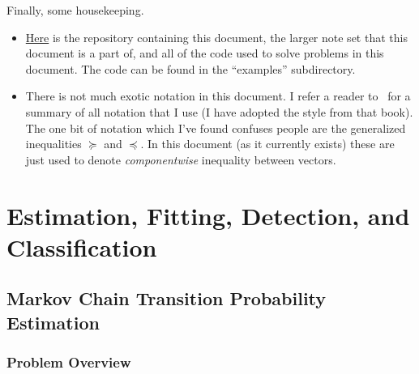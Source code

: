 \documentclass[12pt,reqno]{article}
\theoremstyle{definition}
\numberwithin{equation}{section}
\begin{document}
\vspace{0.2cm}
\noindent Finally, some housekeeping.
\begin{itemize}
    \item \href{https://github.com/healeyq3/applied_math-street_fighting}{Here} is the repository containing this document, the larger note set that this document is a part of,
    and all of the code used to solve problems in this document. The code can be found in the ``examples'' subdirectory.
    \item There is not much exotic notation in this document. I refer a reader to~\cite{boyd_convex_optimization}
    for a summary of all notation that I use (I have adopted the style from that book). The one bit of notation
    which I've found confuses people are the generalized inequalities $\succeq$ and $\preceq$. In this document
    (as it currently exists) these are just used to denote \textit{componentwise} inequality between vectors.
\end{itemize}



\newpage

\section{Estimation, Fitting, Detection, and Classification}

\subsection{Markov Chain Transition Probability Estimation}

\subsubsection*{Problem Overview}
\end{document}
